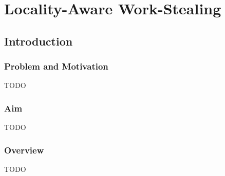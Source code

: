
\part{Locality-Aware Work-Stealing}
\label{part:locality}

\chapter{Introduction}
\label{chap:locality-introduction}

\section{Problem and Motivation}
\label{sec:locality-intro-problem-and-motivation}

TODO

\section{Aim}
\label{sec:locality-intro-aim}

TODO

\section{Overview}
\label{sec:locality-intro-overview}

TODO


